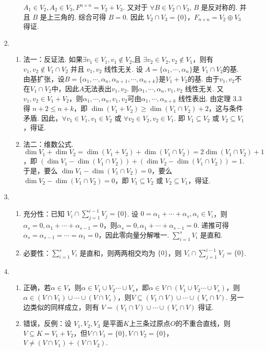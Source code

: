 \begin{enumerate}
\begin{enumerate}
        $A_1\in V_2,A_2\in V_3,F^{n\times n}=V_2+V_3$. 又对于 $\forall B\in V_2\cap V_3$, $B$ 是反对称的. 并且 $B$ 是上三角的. 综合可得  $B=0$. 因此 $V_2\cap V_3=\{0\}$，$F_{n\times n}=V_2\oplus V_3$ 得证.
    \end{enumerate}

    \item \begin{enumerate}
        \item 法一：反证法. 如果$\exists v_1\in V_1,v_1\not\in V_2$,且 $\exists v_2\in V_2,v_2\not\in V_1$，则有 $v_1,v_2\not \in V_1\cap V_2$ 并且 $v_1,v_2$ 线性无关. 设 $A=\{\alpha_1,\cdots ,\alpha_n\}$是 $V_1\cap V_2$的基. 由基扩张，设$B=\{\alpha_1,\cdots ,\alpha_n,\alpha_{n+1},\cdots ,\alpha_{n+k}\}$是$V_1+V_2$的基. 由于$v_1,v_2$不在$V_1\cap V_2$中，因此$A$无法表出$v_1,v_2$. 则$\alpha_1,\cdots ,\alpha_n,v_1,v_2$ 线性无关. 又$v_1,v_2\in V_1+V_2$，则$\alpha_1,\cdots ,\alpha_n,v_1,v_2$可由$\alpha_1,\cdots ,\alpha_{n+k}$ 线性表出. 由定理 $3.3$ 得 $n+2\le n+k$，即 $\dim (V_1+V_2)\ge\dim (V_1\cap V_2)+2$，这与条件矛盾. 因此，$\forall v_1\in V_1,v_1\in V_2$ 或 $\forall v_2\in V_2,v_2\in V_1$. 即 $V_1\subseteq V_2$ 或 $V_2\subseteq V_1$，得证.
        \item 法二：维数公式. $\dim V_1+\dim V_2=\dim  (V_1+V_2)+\dim  (V_1\cap V_2)=2\dim  (V_1\cap V_2)+1$，即 $(\dim V_1-\dim  (V_1\cap V_2))+ (\dim V_2-\dim  (V_1\cap V_2))=1$. 于是，要么 $\dim V_1-\dim  (V_1\cap V_2)=0$，要么 $\dim V_2-\dim  (V_1\cap V_2)=0$，即 $V_1\subseteq V_2$ 或 $V_2\subseteq V_1$，得证.
    \end{enumerate}

    \item \begin{enumerate}
        \item 充分性：已知 $V_i\cap \sum_{j=1}^{i-1}V_j=\{0\}$. 设 $0=\alpha_1+\cdots+\alpha_s,\alpha_i\in V_i$，则 $\alpha_s=0,\alpha_1+\cdots+\alpha_{s-1}=0$，则$\alpha_s=0,\alpha_1+\cdots+\alpha_{s-1}=0$. 递推可得 $\alpha_s=\alpha_{s-1}=\cdots=\alpha_1=0$，因此零向量分解唯一. $\sum_{i=1}^sV_i$ 是直和.
        \item 必要性：$\sum_{i=1}^sV_i$ 是直和，则两两相交均为 $\{0\}$，则 $V_i\cap \sum_{j=1}^{i-1}V_j=\{0\}$.
    \end{enumerate}

    \item \begin{enumerate}
        \item 正确，若$\alpha\in V$，则$\alpha \in V_1\cup V_2\cdots \cup V_s$，即$\alpha \in V\cap (V_1\cup V_2\cdots \cup V_s)$，则$\alpha \in (V\cap V_1)\cup \cdots \cup (V\cap V_s)$，则$V\subseteq(V_1\cap V)\cup \cdots \cup (V_s\cap V)$. 另一边类似的同样成立，则有 $V=(V_1\cap V)\cup \cdots \cup (V_s\cap V)$ 得证.
        \item 错误，反例：设 $V_1,V_2,V_3$ 是平面$K$上三条过原点$O$的不重合直线，则$V\subseteq K=V_1+V_2$，但$V\cap V_1=\{0\},V\cap V_2=\{0\}$，$V\ne (V\cap V_1)+(V\cap V_2)$.
    \end{enumerate}


\end{enumerate}
